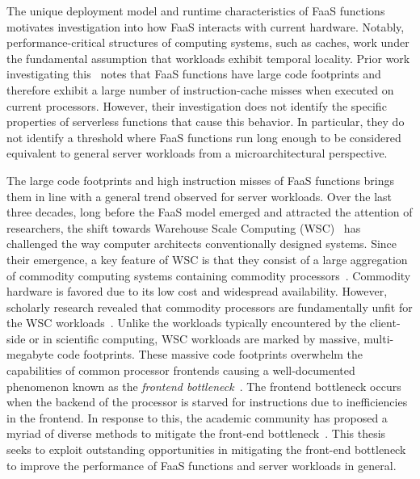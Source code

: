 \documentclass[../main.tex]{subfiles}
\begin{document}
\begin{refsection}
The unique deployment model and runtime characteristics of FaaS
functions motivates investigation into how FaaS interacts with current
hardware. Notably, performance-critical structures of computing
systems, such as caches, work under the fundamental assumption that
workloads exhibit temporal locality. Prior work investigating
this~\cite{lukewarm_serverless} notes that FaaS functions have large
code footprints and therefore exhibit a large number of
instruction-cache misses when executed on current processors. However,
their investigation does not identify the specific properties of
serverless functions that cause this behavior. In particular, they do
not identify a threshold where FaaS functions run long enough to be
considered equivalent to general server workloads from a
microarchitectural perspective.

The large code footprints and high instruction misses of FaaS
functions brings them in line with a general trend observed for server
workloads. Over the last three decades, long before the FaaS model
emerged and attracted the attention of researchers, the shift towards
Warehouse Scale Computing (WSC)~\cite{barroso18_datac_as_comput} has
challenged the way computer architects conventionally designed
systems. Since their emergence, a key feature of WSC is that they
consist of a large aggregation of commodity computing systems
containing commodity
processors~\cite{barroso03_web_searc_planet}. Commodity hardware is
favored due to its low cost and widespread availability. However,
scholarly research revealed that commodity processors are
fundamentally unfit for the WSC
workloads~\cite{ferdman12_clear_cloud,kanev15_profil}. Unlike the
workloads typically encountered by the client-side or in scientific
computing, WSC workloads are marked by massive, multi-megabyte code
footprints. These massive code footprints overwhelm the capabilities
of common processor frontends causing a well-documented phenomenon
known as the \emph{frontend
  bottleneck}~\cite{ailamaki99_dbmss_moder_proces,keeton98_perfor_charac_quad_pentium_pro,ranganathan98_perfor_datab_workl_shared_memor}. The
frontend bottleneck occurs when the backend of the processor is
starved for instructions due to inefficiencies in the frontend. In
response to this, the academic community has proposed a myriad of
diverse methods to mitigate the front-end
bottleneck~\cite{reinman99_fetch_direc_instr_prefet,kumar17_boomer,kumar18_blast_throug_front_end_bottl_with_shotg,kumar20_shoot_down_server_front_end_bottl,ferdman08_tempor,ferdman11_proac_instr_fetch,kaynak13_shift,kaynak15_confl,ayers19_asmdb,ajorpaz18_explor_predic_replac_polic_instr,khan20_i_spy,soundararajan21_pdede,ansari20_divid,khan21_rippl,}.
This thesis seeks to exploit outstanding opportunities in mitigating
the front-end bottleneck to improve the performance of FaaS
functions and server workloads in general.


\end{refsection}
\end{document}
